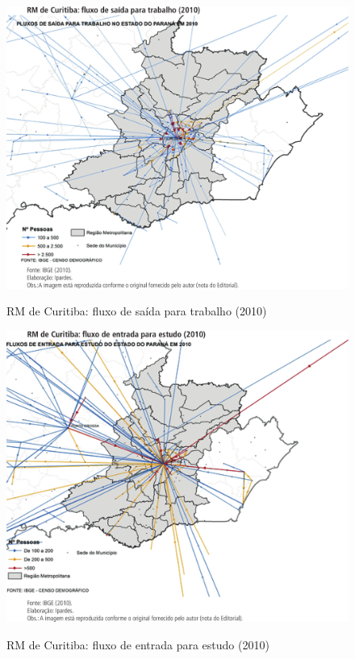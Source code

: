 	\begin{figure}
		\centering
		\caption{RM de Curitiba: fluxo de saída para trabalho (2010)}
		\includegraphics[width=1.0\linewidth]{img/costa2015a_06}
		\label{fig:costa2015a_06}
	\end{figure}
	
	\begin{figure}
		\centering
		\caption{RM de Curitiba: fluxo de entrada para estudo (2010)}
		\includegraphics[width=1.0\linewidth]{img/costa2015a_07}
		\label{fig:costa2015a_07}
	\end{figure}

